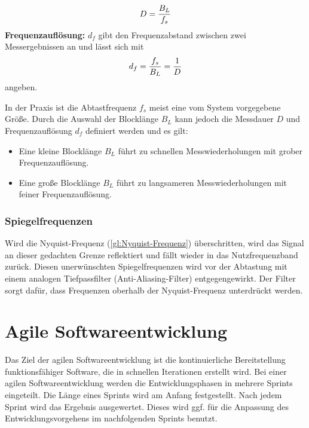 \begin{align}
	\centering
	D = \frac{B_L}{f_s}
	\label{gl:Messdauer}
\end{align}
\textbf{Frequenzauflösung:} $d_f$ gibt den Frequenzabstand zwischen zwei Messergebnissen an und lässt sich mit
\begin{align}
	\centering
	d_f = \frac{f_s}{B_L} = \frac{1}{D}
	\label{gl:Frequenzaufloesung}
\end{align}
angeben.

In der Praxis ist die Abtastfrequenz $f_s$ meist eine vom System vorgegebene Größe. Durch die Auswahl der Blocklänge $B_L$ kann jedoch die Messdauer $D$ und Frequenzauflösung $d_f$ definiert werden und es gilt:\\
\begin{itemize}
	\item Eine kleine Blocklänge $B_L$ führt zu schnellen Messwiederholungen mit grober Frequenzauflösung.
	\item Eine große Blocklänge $B_L$ führt zu langsameren Messwiederholungen mit feiner Frequenzauflösung.
\end{itemize}
\subsubsection{Spiegelfrequenzen}
Wird die Nyquist-Frequenz (\autoref{gl:Nyquist-Frequenz}) überschritten, wird das Signal an dieser gedachten Grenze reflektiert und fällt wieder in das Nutzfrequenzband zurück. Diesen unerwünschten Spiegelfrequenzen wird vor der Abtastung mit einem analogen Tiefpassfilter (Anti-Aliasing-Filter) entgegengewirkt. Der Filter sorgt dafür, dass Frequenzen oberhalb der Nyquist-Frequenz unterdrückt werden. \citep{NTIAudioFFT}\citep{WeissteinFFT}






%
%
%
%
%
%
%



\section{Agile Softwareentwicklung}\label{abs:MethodenderSoftwareentwicklung}
Das Ziel der agilen Softwareentwicklung ist die kontinuierliche Bereitstellung funktionsfähiger Software, die in schnellen Iterationen erstellt wird. 
Bei einer agilen Softwareentwicklung werden die Entwicklungsphasen in mehrere Sprints eingeteilt. Die Länge eines Sprints wird am Anfang festgestellt. Nach jedem Sprint wird das Ergebnis ausgewertet. Dieses wird ggf. für die Anpassung des Entwicklungsvorgehens im nachfolgenden Sprints benutzt. \citep{Brunskill2019}



